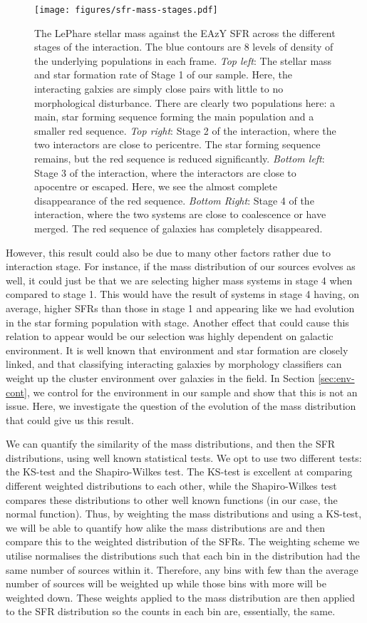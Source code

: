 \documentclass[fleqn,usenatbib]{mnras}
\begin{document}
\begin{figure}
    \centering
    \texttt{[image: figures/sfr-mass-stages.pdf]}
    \caption{The LePhare stellar mass against the EAzY SFR across the different stages of the interaction. The blue contours are 8 levels of density of the underlying populations in each frame. \textit{Top left}: The stellar mass and star formation rate of Stage 1 of our sample. Here, the interacting galxies are simply close pairs with little to no morphological disturbance. There are clearly two populations here: a main, star forming sequence forming the main population and a smaller red sequence. \textit{Top right}: Stage 2 of the interaction, where the two interactors are close to pericentre. The star forming sequence remains, but the red sequence is reduced significantly. \textit{Bottom left}: Stage 3 of the interaction, where the interactors are close to apocentre or escaped. Here, we see the almost complete disappearance of the red sequence. \textit{Bottom Right}: Stage 4 of the interaction, where the two systems are close to coalescence or have merged. The red sequence of galaxies has completely disappeared.}
    \label{fig:sfr-mass}
\end{figure}

However, this result could also be due to many other factors rather due to interaction stage. For instance, if the mass distribution of our sources evolves as well, it could just be that we are selecting higher mass systems in stage 4 when compared to stage 1. This would have the result of systems in stage 4 having, on average, higher SFRs than those in stage 1 and appearing like we had evolution in the star forming population with stage. Another effect that could cause this relation to appear would be our selection was highly dependent on galactic environment. It is well known that environment and star formation are closely linked, and that classifying interacting galaxies by morphology classifiers can weight up the cluster environment over galaxies in the field. In Section \ref{sec:env-cont}, we control for the environment in our sample and show that this is not an issue. Here, we investigate the question of the evolution of the mass distribution that could give us this result.

We can quantify the similarity of the mass distributions, and then the SFR distributions, using well known statistical tests. We opt to use two different tests: the KS-test and the Shapiro-Wilkes test. The KS-test is excellent at comparing different weighted distributions to each other, while the Shapiro-Wilkes test compares these distributions to other well known functions (in our case, the normal function). Thus, by weighting the mass distributions and using a KS-test, we will be able to quantify how alike the mass distributions are and then compare this to the weighted distribution of the SFRs. The weighting scheme we utilise normalises the distributions such that each bin in the distribution had the same number of sources within it. Therefore, any bins with few than the average number of sources will be weighted up while those bins with more will be weighted down. These weights applied to the mass distribution are then applied to the SFR distribution so the counts in each bin are, essentially, the same.
\end{document}
